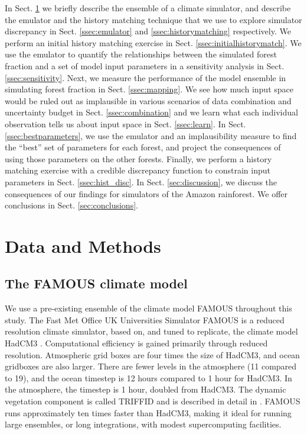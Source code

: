 \documentclass[esd, manuscript]{copernicus}
\begin{document}
In Sect. \ref{sec:dataandmethods} we briefly describe the ensemble of a climate simulator, and describe the emulator and the history matching technique that we use to explore simulator discrepancy in Sect. \ref{ssec:emulator} and \ref{ssec:historymatching} respectively. We perform an initial history matching exercise in Sect. \ref{ssec:initialhistorymatch}. We use the emulator to quantify the relationships between the simulated forest fraction and a set of model input parameters in a sensitivity analysis in Sect. \ref{ssec:sensitivity}. Next, we measure the performance of the model ensemble in simulating forest fraction in Sect. \ref{ssec:mapping}. We see how much input space would be ruled out as implausible in various scenarios of data combination and uncertainty budget in Sect. \ref{ssec:combination} and we learn what each individual observation tells us about input space in Sect. \ref{ssec:learn}. In Sect. \ref{ssec:bestparameters}, we use the emulator and an implausibility measure to find the ``best'' set of parameters for each forest, and project the consequences of using those parameters on the other forests. Finally, we perform a history matching exercise with a credible discrepancy function to constrain input parameters in Sect. \ref{ssec:hist_disc}. In Sect. \ref{sec:discussion}, we discuss the consequences of our findings for simulators of the Amazon rainforest. We offer conclusions in Sect. \ref{sec:conclusions}.


\section{Data and Methods}\label{sec:dataandmethods}

\subsection{The FAMOUS climate model}\label{subsec:FAMOUS}

We use a pre-existing ensemble of the climate model FAMOUS throughout this study. The Fast Met Office UK Universities Simulator FAMOUS \citep{jones2005systematic,smith2008famous} is a reduced resolution climate simulator, based on, and tuned to replicate, the climate model HadCM3 \citep{gordon2000simulation,pope2000impact}. Computational efficiency is gained primarily through reduced resolution. Atmospheric grid boxes are four times the size of HadCM3, and ocean gridboxes are also larger. There are fewer levels in the atmosphere (11 compared to 19), and the ocean timestep is 12 hours compared to 1 hour for HadCM3. In the atmosphere, the timestep is 1 hour, doubled from HadCM3. The dynamic vegetation component is called TRIFFID and is described in detail in \cite{cox2001description}.  FAMOUS runs approximately ten times faster than HadCM3, making it ideal for running large ensembles, or long integrations, with modest supercomputing facilities.
\end{document}
